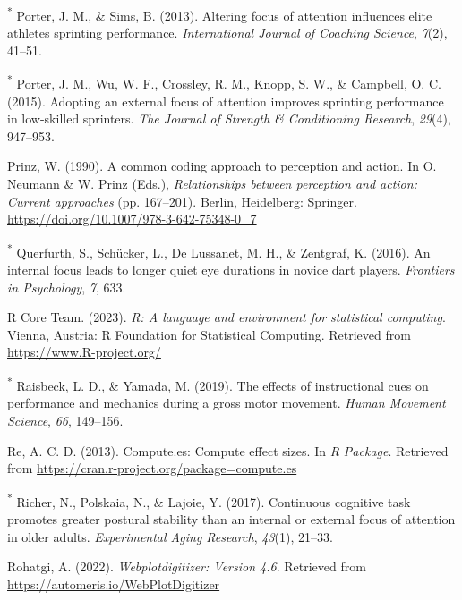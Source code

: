 \documentclass[
  man, donotrepeattitle,floatsintext]{apa7}
\newlength{\cslhangindent}
\newlength{\cslentryspacingunit} %
\newenvironment{CSLReferences}[2] %
 {%
  \setlength{\parindent}{0pt}
  \ifodd #1
  \let\oldpar\par
  \def\par{\hangindent=\cslhangindent\oldpar}
  \fi
  \setlength{\parskip}{#2\cslentryspacingunit}
 }%
 {}
\begin{document}
\begin{CSLReferences}{1}{0}
\leavevmode{}%
\textsuperscript{*} Porter, J. M., \& Sims, B. (2013). Altering focus of attention influences elite athletes sprinting performance. \emph{International Journal of Coaching Science}, \emph{7}(2), 41--51.

\leavevmode{}%
\textsuperscript{*} Porter, J. M., Wu, W. F., Crossley, R. M., Knopp, S. W., \& Campbell, O. C. (2015). Adopting an external focus of attention improves sprinting performance in low-skilled sprinters. \emph{The Journal of Strength \& Conditioning Research}, \emph{29}(4), 947--953.

\leavevmode{}%
Prinz, W. (1990). A common coding approach to perception and action. In O. Neumann \& W. Prinz (Eds.), \emph{Relationships between perception and action: {Current} approaches} (pp. 167--201). {Berlin, Heidelberg}: {Springer}. \url{https://doi.org/10.1007/978-3-642-75348-0_7}

\leavevmode{}%
\textsuperscript{*} Querfurth, S., Schücker, L., De Lussanet, M. H., \& Zentgraf, K. (2016). An internal focus leads to longer quiet eye durations in novice dart players. \emph{Frontiers in Psychology}, \emph{7}, 633.

\leavevmode{}%
R Core Team. (2023). \emph{R: A language and environment for statistical computing}. Vienna, Austria: R Foundation for Statistical Computing. Retrieved from \url{https://www.R-project.org/}

\leavevmode{}%
\textsuperscript{*} Raisbeck, L. D., \& Yamada, M. (2019). The effects of instructional cues on performance and mechanics during a gross motor movement. \emph{Human Movement Science}, \emph{66}, 149--156.

\leavevmode{}%
Re, A. C. D. (2013). Compute.es: Compute effect sizes. In \emph{R Package}. Retrieved from \url{https://cran.r-project.org/package=compute.es}

\leavevmode{}%
\textsuperscript{*} Richer, N., Polskaia, N., \& Lajoie, Y. (2017). Continuous cognitive task promotes greater postural stability than an internal or external focus of attention in older adults. \emph{Experimental Aging Research}, \emph{43}(1), 21--33.

\leavevmode{}%
Rohatgi, A. (2022). \emph{Webplotdigitizer: Version 4.6}. Retrieved from \url{https://automeris.io/WebPlotDigitizer}


\end{CSLReferences}
\end{document}
